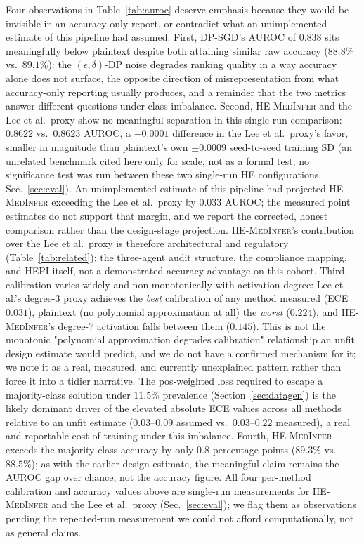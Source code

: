 \documentclass[journal,compsoc]{IEEEtran}
\newcommand{\HEPI}{\textsc{HEPI}}          %
\newcommand{\framework}{\textsc{HE-MedInfer}}
\begin{document}
Four observations in Table~\ref{tab:auroc} deserve emphasis because they
would be invisible in an accuracy-only report, or contradict what an
unimplemented estimate of this pipeline had assumed. First, DP-SGD's AUROC of
$0.838$ sits meaningfully below plaintext despite both attaining similar
raw accuracy ($88.8\%$ vs.\ $89.1\%$): the $(\epsilon,\delta)$-DP noise
degrades ranking quality in a way accuracy alone does not surface, the
opposite direction of misrepresentation from what accuracy-only reporting
usually produces, and a reminder that the two metrics answer different
questions under class imbalance. Second, \framework{} and the Lee et al.\
proxy show no meaningful separation in this single-run comparison: $0.8622$
vs.\ $0.8623$ AUROC, a $-0.0001$ difference in the Lee et al.\ proxy's favor, smaller
in magnitude than plaintext's own $\pm 0.0009$ seed-to-seed training SD (an
unrelated benchmark cited here only for scale, not as a formal test; no
significance test was run between these two single-run HE configurations,
Sec.~\ref{sec:eval}). An unimplemented estimate
of this pipeline had projected \framework{} exceeding the Lee et al.\ proxy by
$0.033$ AUROC; the measured point estimates do not support that margin, and we
report the corrected, honest comparison rather than the design-stage
projection. \framework{}'s contribution over the Lee et al.\ proxy is
therefore architectural and regulatory (Table~\ref{tab:related}): the
three-agent audit structure, the compliance mapping, and \HEPI{} itself,
not a demonstrated accuracy advantage on this cohort. Third, calibration varies
widely and non-monotonically with activation degree: Lee et al.'s degree-3
proxy achieves the \emph{best} calibration of any method measured (ECE
$0.031$), plaintext (no polynomial approximation at all) the \emph{worst}
($0.224$), and \framework{}'s degree-7 activation falls between them
($0.145$). This is not the monotonic "polynomial approximation degrades
calibration" relationship an unfit design estimate would predict, and we do
not have a confirmed mechanism for it; we note it as a real, measured, and
currently unexplained pattern rather than force it into a tidier narrative.
The pos-weighted loss required to escape a majority-class solution under
$11.5\%$ prevalence (Section~\ref{sec:datagen}) is the likely dominant driver
of the elevated absolute ECE values across all methods relative to an unfit
estimate ($0.03$--$0.09$ assumed vs.\ $0.03$--$0.22$ measured), a real and
reportable cost of training under this imbalance. Fourth, \framework{}
exceeds the majority-class accuracy by only $0.8$ percentage points ($89.3\%$
vs.\ $88.5\%$); as with the earlier design estimate, the meaningful claim
remains the AUROC gap over chance, not the accuracy figure. All four
per-method calibration and accuracy values above are single-run measurements
for \framework{} and the Lee et al.\ proxy (Sec.~\ref{sec:eval}); we flag
them as observations pending the repeated-run measurement we could not
afford computationally, not as general claims.
\end{document}
